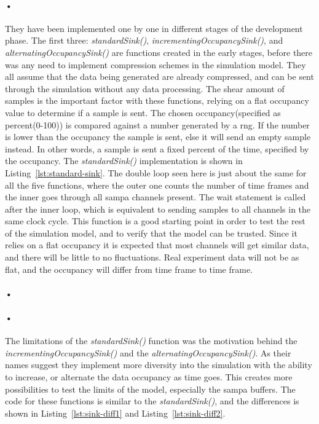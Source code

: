 \documentclass[a4paper, 12pt, openright, twoside]{report}
\begin{document}
\paragraph{•}
They have been implemented one by one in different stages of the development phase.
The first three: \textit{standardSink()}, \textit{incrementingOccupancySink()}, and \textit{alternatingOccupancySink()} are functions created in the early stages, before there was any need to implement compression schemes in the simulation model.
They all assume that the data being generated are already compressed, and can be sent through the simulation without any data processing.
The shear amount of samples is the important factor with these functions, relying on a flat occupancy value to determine if a sample is sent.
The chosen occupancy(specified as percent(0-100)) is compared against a number generated by a \gls{rng}.
If the number is lower than the occupancy the sample is sent, else it will send an empty sample instead.
In other words, a sample is sent a fixed percent of the time, specified by the occupancy.
The \textit{standardSink()} implementation is shown in Listing~\ref{lst:standard-sink}.
The double loop seen here is just about the same for all the five functions, where the outer one counts the number of time frames and the inner goes through all \gls{sampa} channels present.
The wait statement is called after the inner loop, which is equivalent to sending samples to all channels in the same clock cycle.
This function is a good starting point in order to test the rest of the simulation model, and to verify that the model can be trusted.
Since it relies on a flat occupancy it is expected that most channels will get similar data, and there will be little to no fluctuations.
Real experiment data will not be as flat, and the occupancy will differ from time frame to time frame.

\paragraph{•}
\begin{minipage}{\linewidth}

\end{minipage}

\paragraph{•}
The limitations of the \textit{standardSink()} function was the motivation behind the \textit{incrementingOccupancySink()} and the \textit{alternatingOccupancySink()}.
As their names suggest they implement more diversity into the simulation with the ability to increase, or alternate the data occupancy as time goes.
This creates more possibilities to test the limits of the model, especially the \gls{sampa} buffers.
The code for these functions is similar to the \textit{standardSink()}, and the differences is shown in Listing~\ref{lst:sink-diff1} and Listing~\ref{lst:sink-diff2}.
\end{document}
